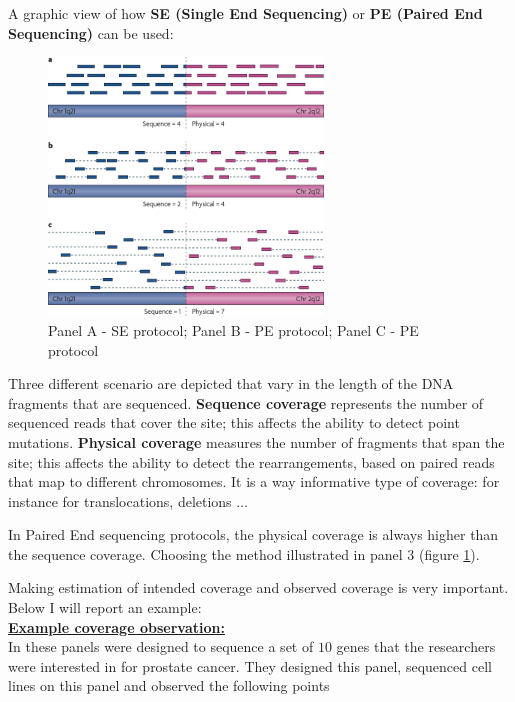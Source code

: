 A graphic view of how \textbf{SE (Single End Sequencing)} or \textbf{PE (Paired
End Sequencing)} can be used:

\begin{figure}[H]
  \includegraphics[width=0.65\textwidth]{image15.png}
  \centering
  \caption{Panel A - SE protocol; Panel B - PE protocol; Panel C - PE protocol}
  \label{fig: physical coverage vs coverage}
\end{figure}

Three different scenario are depicted that vary in the length of the DNA
fragments that are sequenced. \textbf{Sequence coverage} represents the number
of sequenced reads that cover the site; this affects the ability to detect point
mutations. \textbf{Physical coverage} measures the number of fragments that span
the site; this affects the ability to detect the rearrangements, based on paired
reads that map to different chromosomes. It is a way informative type of
coverage: for instance for translocations, deletions $\dots$

In Paired End sequencing protocols, the physical coverage is always higher than
the sequence coverage. Choosing the method illustrated in panel 3 (figure
\ref{fig: physical coverage vs coverage}).

Making estimation of intended coverage and observed coverage is very important.
Below I will report an example:\\


\noindent \underline{\textbf{Example coverage observation:}}\\

In these panels were designed to sequence a set of $10$ genes that the
researchers were interested in for prostate cancer. They designed this panel,
sequenced cell lines on this panel and observed the following points

